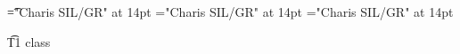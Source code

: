 \documentclass[a4paper]{article}
\begin{document}
\pagestyle{plain}
\sloppy
\setlength{\parfillskip}{0pt plus 1fil}
\font\t="Charis SIL/GR" at 14pt
\font\xt="Charis SIL/GR" at 14pt
\font\vxt="Charis SIL/GR" at 14pt

\mbox{} 
\newpage 
\newpage 
\setcounter{page}{1} 
\pagestyle{fancy} 

\t{T1 class }


\end{document}
